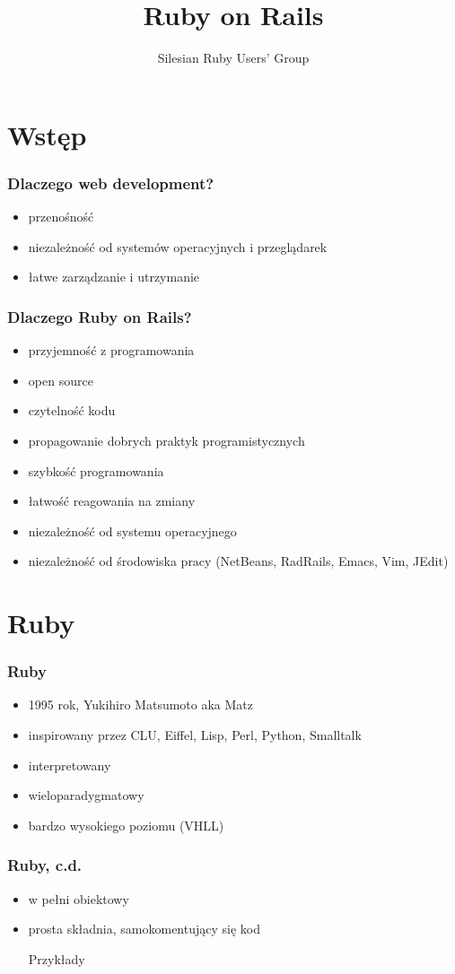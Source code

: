 \documentclass[12t]{beamer}
\author{Silesian Ruby Users' Group}
\title{Ruby on Rails}
\begin{document}
\frame{\titlepage}

\section{Wstęp}
\begin{frame}
  \frametitle{Dlaczego web development?}
  \begin{itemize}
  \item przenośność
  \item niezależność od systemów operacyjnych i przeglądarek
  \item łatwe zarządzanie i utrzymanie
  \end{itemize}
\end{frame}

\begin{frame}
  \frametitle{Dlaczego Ruby on Rails?}
  \begin{itemize}
  \item przyjemność z programowania
  \item open source
  \item czytelność kodu
  \item propagowanie dobrych praktyk programistycznych
  \item szybkość programowania
  \item łatwość reagowania na zmiany
  \item niezależność od systemu operacyjnego
  \item niezależność od środowiska pracy (NetBeans, RadRails, Emacs,
    Vim, JEdit)
  \end{itemize}
\end{frame}

\section{Ruby}
\begin{frame}
  \frametitle{Ruby}
  \begin{itemize}
  \item 1995 rok, Yukihiro Matsumoto aka Matz
  \item inspirowany przez CLU, Eiffel, Lisp, Perl, Python, Smalltalk
  \item interpretowany
  \item wieloparadygmatowy
  \item bardzo wysokiego poziomu (VHLL)
  \end{itemize}
\end{frame}

\begin{frame}
  \frametitle{Ruby, c.d.}
  \begin{itemize}
  \item w pełni obiektowy
  \item prosta składnia, samokomentujący się kod
    \begin{block}{Przykłady}
      
    \end{block}
  \end{itemize}
\end{frame}
\end{document}
